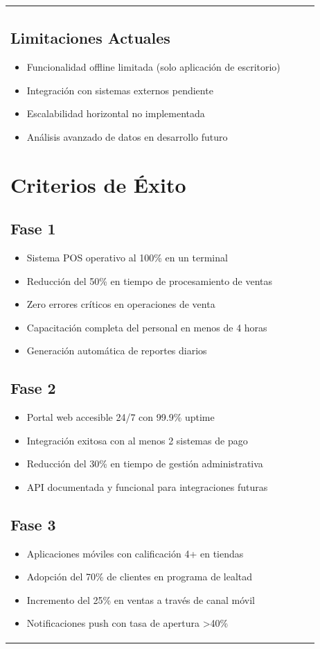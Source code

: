 \documentclass[12pt,letterpaper]{article}
\begin{document}
\begin{longtable}{|p{3cm}|p{2cm}|p{4cm}|p{6cm}|}
\subsection{Limitaciones Actuales}
\begin{itemize}
    \item Funcionalidad offline limitada (solo aplicación de escritorio)
    \item Integración con sistemas externos pendiente
    \item Escalabilidad horizontal no implementada
    \item Análisis avanzado de datos en desarrollo futuro
\end{itemize}

\section{Criterios de Éxito}

\subsection{Fase 1}
\begin{itemize}
    \item Sistema POS operativo al 100\% en un terminal
    \item Reducción del 50\% en tiempo de procesamiento de ventas
    \item Zero errores críticos en operaciones de venta
    \item Capacitación completa del personal en menos de 4 horas
    \item Generación automática de reportes diarios
\end{itemize}

\subsection{Fase 2}
\begin{itemize}
    \item Portal web accesible 24/7 con 99.9\% uptime
    \item Integración exitosa con al menos 2 sistemas de pago
    \item Reducción del 30\% en tiempo de gestión administrativa
    \item API documentada y funcional para integraciones futuras
\end{itemize}

\subsection{Fase 3}
\begin{itemize}
    \item Aplicaciones móviles con calificación 4+ en tiendas
    \item Adopción del 70\% de clientes en programa de lealtad
    \item Incremento del 25\% en ventas a través de canal móvil
    \item Notificaciones push con tasa de apertura >40\%
\end{itemize}


\end{longtable}
\end{document}
